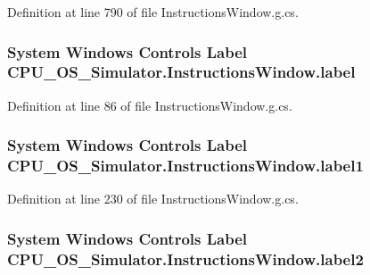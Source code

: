 Definition at line 790 of file Instructions\+Window.\+g.\+cs.

\hypertarget{class_c_p_u___o_s___simulator_1_1_instructions_window_a71ce6968170dda46d83aefc71b63a96d}{}
\subsubsection[{label}]{\setlength{\rightskip}{0pt plus 5cm}System Windows Controls Label C\+P\+U\+\_\+\+O\+S\+\_\+\+Simulator.\+Instructions\+Window.\+label\hspace{0.3cm}{\ttfamily [package]}}\label{class_c_p_u___o_s___simulator_1_1_instructions_window_a71ce6968170dda46d83aefc71b63a96d}


Definition at line 86 of file Instructions\+Window.\+g.\+cs.

\hypertarget{class_c_p_u___o_s___simulator_1_1_instructions_window_a499640eb8a98693f1833dad30f5d8cb4}{}
\subsubsection[{label1}]{\setlength{\rightskip}{0pt plus 5cm}System Windows Controls Label C\+P\+U\+\_\+\+O\+S\+\_\+\+Simulator.\+Instructions\+Window.\+label1\hspace{0.3cm}{\ttfamily [package]}}\label{class_c_p_u___o_s___simulator_1_1_instructions_window_a499640eb8a98693f1833dad30f5d8cb4}


Definition at line 230 of file Instructions\+Window.\+g.\+cs.

\hypertarget{class_c_p_u___o_s___simulator_1_1_instructions_window_a237621e58e68c4a07cdf8803cc1614fd}{}
\subsubsection[{label2}]{\setlength{\rightskip}{0pt plus 5cm}System Windows Controls Label C\+P\+U\+\_\+\+O\+S\+\_\+\+Simulator.\+Instructions\+Window.\+label2\hspace{0.3cm}{\ttfamily [package]}}\label{class_c_p_u___o_s___simulator_1_1_instructions_window_a237621e58e68c4a07cdf8803cc1614fd}


